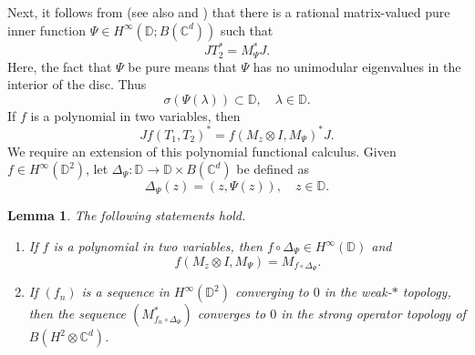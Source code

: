 \documentclass[10pt]{amsart}
\newcommand{\bC}{{\mathbb{C}}}
\newcommand{\bD}{{\mathbb{D}}}
\newtheorem{lemma}{Lemma}[section]
\theoremstyle{definition}
\begin{document}
Next, it follows from \cite[Theorems 3.1 and 4.3]{DS2017} (see also \cite[Theorem 1.5]{DS2024} and \cite[Theorem 5.2]{sarkar2024}) that there is a rational matrix-valued pure inner function $\Psi\in H^\infty(\bD;B(\bC^d))$ such that 
\[
JT_2^*= M_\Psi^* J.
\]
Here, the fact that $\Psi$ be pure means that $\Psi$ has no unimodular eigenvalues in the interior of the disc. Thus
\begin{equation}\label{Eq:specPsi}
\sigma(\Psi(\lambda))\subset \bD, \quad \lambda\in \bD.
\end{equation}
If $f$ is a polynomial in two variables, then
\begin{equation}\label{Eq:functcalcpoly}
Jf(T_1,T_2)^*=f(M_z\otimes I,M_\Psi)^* J.
\end{equation}
We require an extension of this polynomial functional calculus. Given $f\in H^\infty(\bD^2)$, let $\Delta_\Psi:\bD\to \bD\times B(\bC^d)$ be defined as
\[
\Delta_\Psi(z)=(z,\Psi(z)), \quad z\in \bD.
\]
\begin{lemma}\label{L:weak*}
The following statements hold.
\begin{enumerate}[{\rm (i)}]
\item If $f$ is a polynomial in two variables, then $f\circ \Delta_\Psi\in H^\infty(\bD)$ and
\[
f(M_z\otimes I,M_\Psi)=M_{f\circ \Delta_\Psi}.
\]
\item If $(f_n)$ is a sequence in $H^\infty(\bD^2)$ converging to $0$ in the weak-$*$ topology, then the sequence $(M_{f_n\circ \Delta_\Psi}^*)$ converges to $0$ in the strong operator topology of $B(H^2\otimes \bC^d)$.
\end{enumerate}
\end{lemma}
\end{document}
